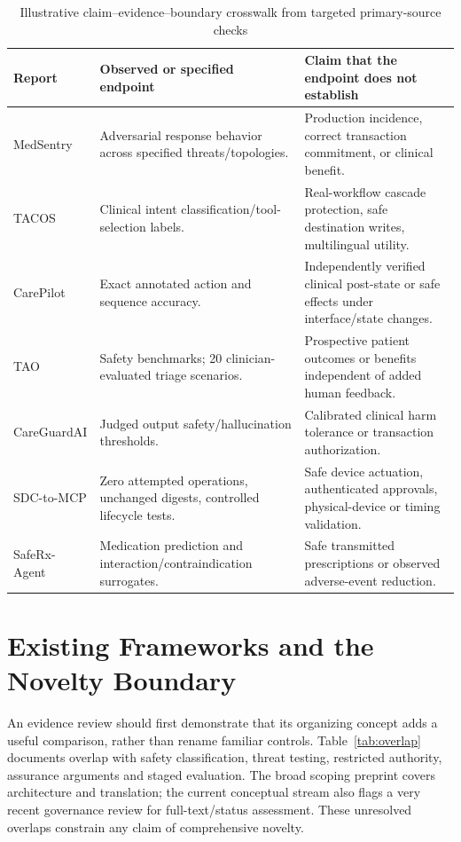 \documentclass[journal,10pt]{IEEEtran}
\begin{document}
\begin{table}[t]\caption{Illustrative claim--evidence--boundary crosswalk from targeted primary-source checks}\label{tab:claims}\centering\footnotesize
\begin{tabularx}{\textwidth}{@{}p{}p{}Y@{}}\toprule
Report & Observed or specified endpoint & Claim that the endpoint does not establish \\\midrule
MedSentry \cite{medsentry} & Adversarial response behavior across specified threats/topologies. & Production incidence, correct transaction commitment, or clinical benefit.\\
TACOS \cite{tacos} & Clinical intent classification/tool-selection labels. & Real-workflow cascade protection, safe destination writes, multilingual utility.\\
CarePilot \cite{carepilot} & Exact annotated action and sequence accuracy. & Independently verified clinical post-state or safe effects under interface/state changes.\\
TAO \cite{tieredoversight} & Safety benchmarks; 20 clinician-evaluated triage scenarios. & Prospective patient outcomes or benefits independent of added human feedback.\\
CareGuardAI \cite{careguard} & Judged output safety/hallucination thresholds. & Calibrated clinical harm tolerance or transaction authorization.\\
SDC-to-MCP \cite{sdcgateway} & Zero attempted operations, unchanged digests, controlled lifecycle tests. & Safe device actuation, authenticated approvals, physical-device or timing validation.\\
SafeRx-Agent \cite{saferx} & Medication prediction and interaction/contraindication surrogates. & Safe transmitted prescriptions or observed adverse-event reduction.\\\bottomrule
\end{tabularx}\end{table}

\section{Existing Frameworks and the Novelty Boundary}
An evidence review should first demonstrate that its organizing concept adds a useful comparison, rather than rename familiar controls. Table~\ref{tab:overlap} documents overlap with safety classification, threat testing, restricted authority, assurance arguments and staged evaluation. The broad scoping preprint covers architecture and translation; the current conceptual stream also flags a very recent governance review for full-text/status assessment. These unresolved overlaps constrain any claim of comprehensive novelty.
\end{document}
